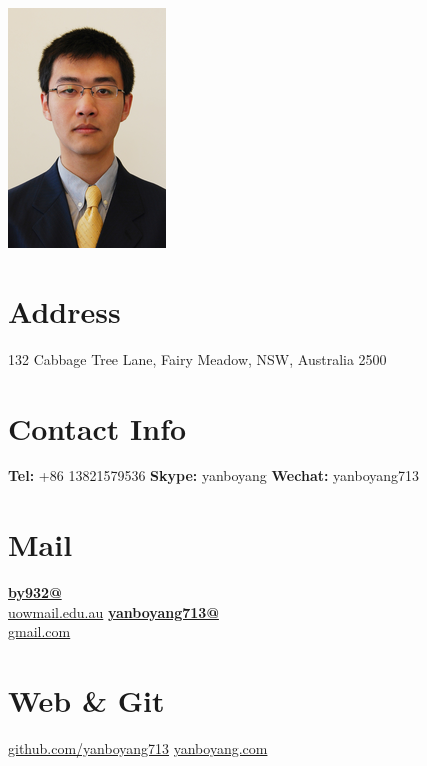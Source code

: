 \documentclass[]{friggeri-cv}
\begin{document}
     

\begin{aside}
  \includegraphics[scale=0.07]{img/boyang.png}
  \section{Address}
  132 Cabbage Tree Lane,
  Fairy Meadow,  NSW,
  Australia 2500
    ~
  \section{Contact Info}
    \textbf{Tel:} +86 13821579536
    \textbf{Skype:} yanboyang
    \textbf{Wechat:} yanboyang713
    ~
  \section{Mail}
    \href{mailto:by932@uowmail.edu.au}{\textbf{by932@}\\uowmail.edu.au}
    \href{mailto:yanboyang713@gmail.com}{\textbf{yanboyang713@}\\gmail.com}
    ~
  \section{Web \& Git}
    \href{https://github.com/yanboyang713}{github.com/yanboyang713}
    \href{http://www.yanboyang.com}{yanboyang.com}
    ~

\end{aside}
\end{document}
